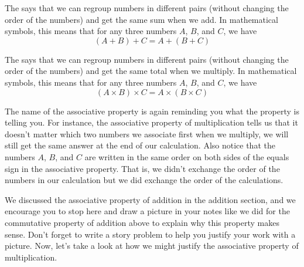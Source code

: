 \documentclass{ximera}
\begin{document}
\begin{definition}
The  says that we can regroup numbers in different pairs (without changing the order of the numbers) and get the same sum when we add. In mathematical symbols, this means that for any three numbers $A$, $B$, and $C$, we have
\[
(A + B) + C = A + (B+C)
\]
\end{definition}

\begin{definition}
The  says that we can regroup numbers in different pairs (without changing the order of the numbers) and get the same total when we multiply. In mathematical symbols, this means that for any three numbers $A$, $B$, and $C$, we have
\[
(A \times B) \times C = A \times (B\times C)
\]
\end{definition}

The name of the associative property is again reminding you what the property is telling you. For instance, the associative property of multiplication tells us that it doesn't matter which two numbers we associate first when we multiply, we will still get the same answer at the end of our calculation. Also notice that the numbers $A$, $B$, and $C$ are written in the same order on both sides of the equals sign in the associative property. That is, we didn't exchange the order of the numbers in our calculation but we did exchange the order of the calculations.

We discussed the associative property of addition in the addition section, and we encourage you to stop here and draw a picture in your notes like we did for the commutative property of addition above to explain why this property makes sense. Don't forget to write a story problem to help you justify your work with a picture. Now, let's take a look at how we might justify the associative property of multiplication.
\end{document}
